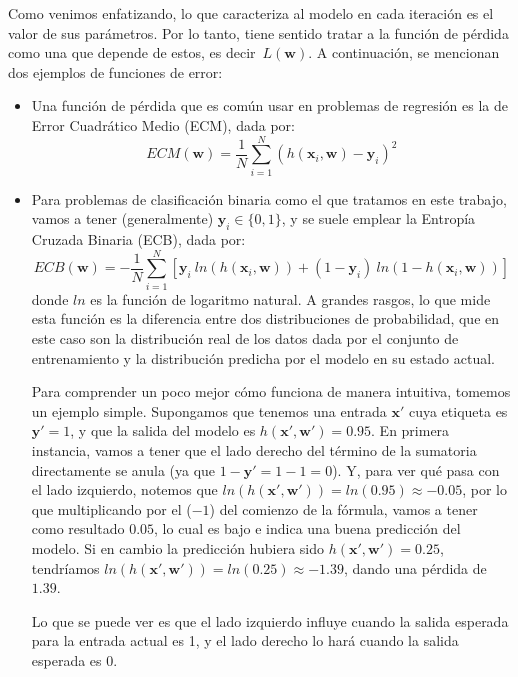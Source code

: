 \documentclass[../../main.tex]{subfiles}
\begin{document}
Como venimos enfatizando, lo que caracteriza al modelo en cada iteración es el valor de
sus parámetros. Por lo tanto, tiene sentido tratar a la función de pérdida como una que
depende de estos, es decir\footnotemark\ \(L(\bm{w})\). A continuación, se mencionan dos ejemplos de funciones de error:
\begin{itemize}
    \item Una función de pérdida que es común usar en problemas de regresión es la de
    Error Cuadrático Medio (ECM), dada por:
    \[
    ECM(\bm{w}) = \frac{1}{N} \sum_{i=1}^{N} \left(h(\bm{x}_i, \bm{w}) - \bm{y}_i\right)^2
    \]
    \item Para problemas de clasificación binaria como el que tratamos en este trabajo, vamos a tener
    (generalmente) \(\bm{y}_i \in \{0,1\}\), y se suele emplear la Entropía Cruzada Binaria (ECB), dada por:
    \[
    ECB(\bm{w}) = -\frac{1}{N} \sum_{i=1}^{N}
        \left[
            \bm{y}_i\ ln(h(\bm{x}_i, \bm{w})) + (1 - \bm{y}_i)\ ln(1 - h(\bm{x}_i, \bm{w}))
        \right]
    \]
    donde \(ln\) es la función de logaritmo natural. A grandes rasgos, lo que mide esta
    función es la diferencia entre dos distribuciones de probabilidad, que en este caso
    son la distribución real de los datos dada por el conjunto de entrenamiento y la
    distribución predicha por el modelo en su estado actual.

    Para comprender un poco mejor cómo funciona de manera intuitiva, tomemos un ejemplo
    simple. Supongamos que tenemos una entrada \(\bm{x}'\) cuya etiqueta es \(\bm{y}'=1\),
    y que la salida del modelo es \(h(\bm{x}', \bm{w}') = 0{.}95\). En primera instancia,
    vamos a tener que el lado derecho del término de la sumatoria directamente se anula
    (ya que \(1-\bm{y}' = 1-1 = 0\)). Y, para ver qué pasa con el lado izquierdo, notemos
    que \(ln(h(\bm{x}', \bm{w}')) = ln(0{.}95) \approx -0{.}05\), por lo que multiplicando
    por el (\(-1\)) del comienzo de la fórmula, vamos a tener como resultado \(0{.}05\),
    lo cual es bajo e indica una buena predicción del modelo. Si en cambio la predicción
    hubiera sido \(h(\bm{x}', \bm{w}') = 0{.}25\), tendríamos \(ln(h(\bm{x}', \bm{w}')) =
    ln(0{.}25) \approx -1{.}39\), dando una pérdida de \(1{.}39\).

    Lo que se puede ver es que el lado izquierdo influye cuando la salida esperada para la
    entrada actual es 1, y el lado derecho lo hará cuando la salida esperada es 0.
\end{itemize}
\end{document}

